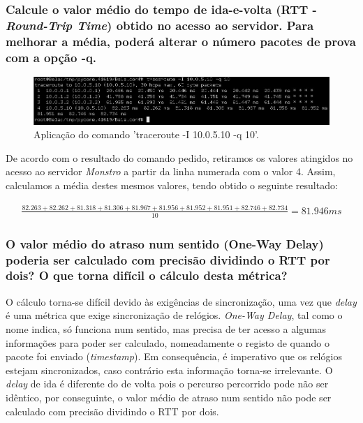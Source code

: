 \subsubsection{Calcule o valor médio do tempo de ida-e-volta (RTT - \textit{Round-Trip Time}) obtido no acesso ao servidor. Para melhorar a média, poderá alterar o número pacotes de prova com a opção -q.}

    \begin{figure}[H]
        \centering
        \includegraphics[width=500pt]{images/ParteI/Questao1/questao1-d.jpg}
        \caption{Aplicação do comando 'traceroute -I 10.0.5.10 -q 10'.} \label{tracerouteMedia}
    \end{figure}
    
    \par De acordo com o resultado do comando pedido, retiramos os valores atingidos no acesso ao servidor \textit{Monstro} a partir da linha numerada com o valor 4. Assim, calculamos a média destes mesmos valores, tendo obtido o seguinte resultado:

    \begin{align*}  
    \frac{82.263+82.262+81.318+81.306+81.967+81.956+81.952+81.951+82.746+82.734}{10} = 81.946 ms  
    \end{align*}  
    


\subsubsection{O valor médio do atraso num sentido (One-Way Delay) poderia ser calculado com precisão dividindo o RTT por dois? O que torna difícil o cálculo desta métrica?}
    
    O cálculo torna-se difícil devido às exigências de sincronização, uma vez que \textit{delay} é uma métrica que exige sincronização de relógios. \textit{One-Way Delay}, tal como o nome indica, só funciona num sentido, mas precisa de ter acesso a algumas informações para poder ser calculado, nomeadamente o registo de quando o pacote foi enviado (\textit{timestamp}). Em consequência, é imperativo que os relógios estejam sincronizados, caso contrário esta informação torna-se irrelevante.
     O \textit{delay} de ida é diferente do de volta pois o percurso percorrido pode não ser idêntico, por conseguinte, o valor médio de atraso num sentido não pode ser calculado com precisão dividindo o RTT por dois.
    
